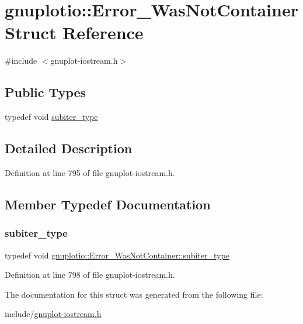 \hypertarget{structgnuplotio_1_1_error___was_not_container}{}\section{gnuplotio\+:\+:Error\+\_\+\+Was\+Not\+Container Struct Reference}
\label{structgnuplotio_1_1_error___was_not_container}


{\ttfamily \#include $<$gnuplot-\/iostream.\+h$>$}

\subsection*{Public Types}
\begin{DoxyCompactItemize}
\item 
typedef void \hyperlink{structgnuplotio_1_1_error___was_not_container_aeac5de90c903be765130fc14f85dfb00}{subiter\+\_\+type}
\end{DoxyCompactItemize}


\subsection{Detailed Description}


Definition at line 795 of file gnuplot-\/iostream.\+h.



\subsection{Member Typedef Documentation}
\mbox{\label{structgnuplotio_1_1_error___was_not_container_aeac5de90c903be765130fc14f85dfb00}} 
\subsubsection{\texorpdfstring{subiter\+\_\+type}{subiter\_type}}
{\footnotesize\ttfamily typedef void \hyperlink{structgnuplotio_1_1_error___was_not_container_aeac5de90c903be765130fc14f85dfb00}{gnuplotio\+::\+Error\+\_\+\+Was\+Not\+Container\+::subiter\+\_\+type}}



Definition at line 798 of file gnuplot-\/iostream.\+h.



The documentation for this struct was generated from the following file\+:\begin{DoxyCompactItemize}
\item 
include/\hyperlink{gnuplot-iostream_8h}{gnuplot-\/iostream.\+h}\end{DoxyCompactItemize}

